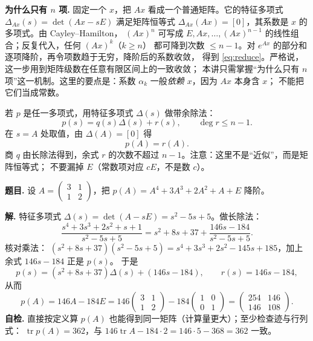 \documentclass[11pt]{ctexart}
\newcommand{\pmat}[1]{\begin{pmatrix}#1\end{pmatrix}}
\newcommand{\zero}{[0]}
\newcommand{\Ax}{Ax}
\begin{document}
\textbf{为什么只有 $n$ 项.} 固定一个 $x$，把 $\Ax$ 看成一个普通矩阵。它的特征多项式
$\Delta_{\Ax}(s)=\det(\Ax-sE)$ 满足矩阵恒等式 $\Delta_{\Ax}(\Ax)=\zero$，其系数是 $x$ 的多项式。由 Cayley--Hamilton，
$(\Ax)^n$ 可写成 $E,\Ax,\dots,(\Ax)^{n-1}$ 的线性组合；反复代入，任何 $(\Ax)^k$（$k\ge n$）
都可降到次数 $\le n-1$。对 $e^{Ax}$ 的部分和逐项降阶，再令项数趋于无穷，降阶后的系数收敛，
得到 \eqref{eq:reduce}。严格说，这一步用到矩阵级数在任意有限区间上的一致收敛；
本讲只需掌握“为什么只有 $n$ 项”这一机制。这里的要点是：系数 $\alpha_k$ 一般\emph{依赖 $x$}，因为 $\Ax$ 本身含 $x$；
不能把它们当成常数。


若 $p$ 是任一多项式，用特征多项式 $\Delta(s)$ 做带余除法：
\[
p(s)=q(s)\Delta(s)+r(s),\qquad \deg r\le n-1 .
\]
在 $s=A$ 处取值，由 $\Delta(A)=\zero$ 得
\begin{equation}\label{eq:remainder}
p(A)=r(A).
\end{equation}
商 $q$ 由长除法得到，余式 $r$ 的次数不超过 $n-1$。注意：这里不是“近似”，而是矩阵恒等式；
不要漏掉 $E$（常数项对应 $cE$，不是数 $c$）。

\clearpage
{}

\textbf{题目.} 设 $A=\pmat{3&1\\1&2}$，把 $p(A)=A^4+3A^3+2A^2+A+E$ 降阶。

\textbf{解.} 特征多项式 $\Delta(s)=\det(A-sE)=s^2-5s+5$。做长除法：
\[
\frac{s^4+3s^3+2s^2+s+1}{s^2-5s+5}
=s^2+8s+37+\frac{146s-184}{s^2-5s+5}.
\]
核对乘法：
$(s^2+8s+37)(s^2-5s+5)=s^4+3s^3+2s^2-145s+185$，加上余式 $146s-184$ 正是 $p(s)$。
于是
\[
p(s)=(s^2+8s+37)\Delta(s)+(146s-184),\qquad r(s)=146s-184,
\]
从而
\[
p(A)=146A-184E
=146\pmat{3&1\\1&2}-184\pmat{1&0\\0&1}
=\pmat{254&146\\146&108}.
\]
\textbf{自检.} 直接按定义算 $p(A)$ 也能得到同一矩阵（计算量更大）；至少检查迹与行列式：
$\operatorname{tr}p(A)=362$，与 $146\operatorname{tr}A-184\cdot2=146\cdot5-368=362$ 一致。

\end{document}
